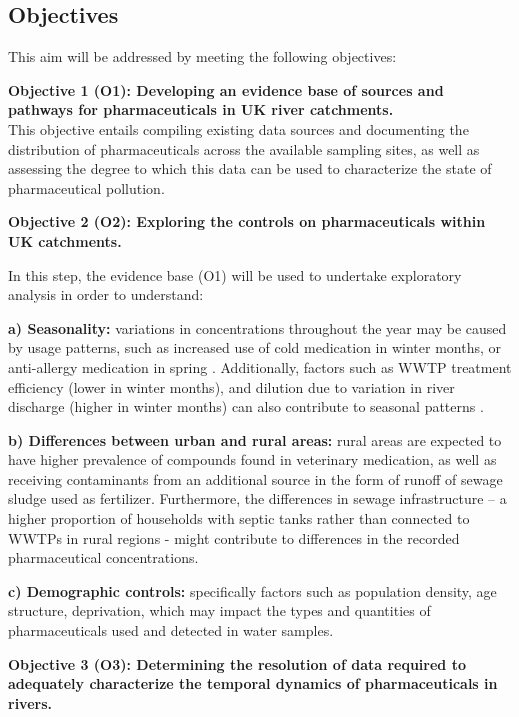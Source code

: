 \documentclass{article}
\begin{document}
\subsection{Objectives}
This aim will be addressed by meeting the following objectives:

\textbf{Objective 1 (O1): Developing an evidence base of sources and pathways for pharmaceuticals in UK river catchments. }\\
This objective entails compiling existing data sources and documenting the distribution of pharmaceuticals across the available sampling sites, as well as assessing the degree to which this data can be used to characterize the state of pharmaceutical pollution.

\vspace{5mm}
\textbf{Objective 2 (O2): Exploring the controls on pharmaceuticals within UK catchments.}

In this step, the evidence base (O1) will be used to undertake exploratory analysis in order to understand:

\textbf{a) Seasonality:} variations in concentrations throughout the year may be caused by usage patterns, such as increased use of cold medication in winter months, or anti-allergy medication in spring \citep{Vatovec2016InvestigatingSetting}. Additionally, factors such as WWTP treatment efficiency (lower in winter months), and dilution due to variation in river discharge (higher in winter months) can also contribute to  seasonal patterns \citep{Comber2020SeasonalWaters}.

\textbf{b) Differences between urban and rural areas:} rural areas are expected to have higher prevalence of compounds found in veterinary medication, as well as receiving contaminants from an additional source in the form of runoff of sewage sludge used as fertilizer. Furthermore, the differences in sewage infrastructure – a higher proportion of households with septic tanks rather than connected to WWTPs in rural regions - might contribute to differences in the recorded pharmaceutical concentrations.

\textbf{c) Demographic controls:} specifically factors such as population density, age structure, deprivation, which may impact the types and quantities of pharmaceuticals used and detected in water samples.


\vspace{5mm}
\textbf{Objective 3 (O3): Determining the resolution of data required to adequately characterize the temporal dynamics of pharmaceuticals in rivers.}
\end{document}
